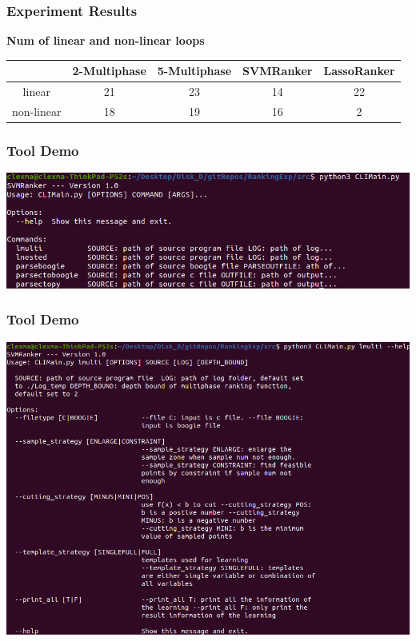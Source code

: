 \documentclass[10pt]{beamer}
\begin{document}
\begin{frame}\frametitle{Experiment Results}
\textbf{Num of linear and non-linear loops}
\begin{center}
\begin{tabular}{|c|c|c|c|c|}
\hline
 & 2-Multiphase& 5-Multiphase & SVMRanker & LassoRanker\\

 
\hline
linear &   21 & 23 & 14 & 22\\
\hline 
non-linear &  18& 19 & 16 & 2\\
\hline
\end{tabular}
\end{center}
\end{frame}

\begin{frame}\frametitle{Tool Demo}
\begin{center}
\includegraphics[scale=0.4]{1.png}
\end{center}

\end{frame}

\begin{frame}\frametitle{Tool Demo}
\begin{center}
\includegraphics[scale=0.36]{2.png}
\end{center}

\end{frame}
\end{document}
